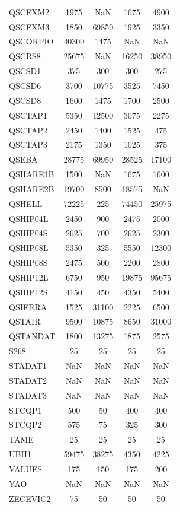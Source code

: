 \begin{longtable}{lcccc}
QSCFXM2  &     1975 &   NaN &     1675 &     4900 \\
QSCFXM3  &     1850 & 69850 &     1925 &     3350 \\
QSCORPIO &    40300 &  1475 &      NaN &      NaN \\
QSCRS8   &    25675 &   NaN &    16250 &    38950 \\
QSCSD1   &      375 &   300 &      300 &      275 \\
QSCSD6   &     3700 & 10775 &     3525 &     7450 \\
QSCSD8   &     1600 &  1475 &     1700 &     2500 \\
QSCTAP1  &     5350 & 12500 &     3075 &     2275 \\
QSCTAP2  &     2450 &  1400 &     1525 &      475 \\
QSCTAP3  &     2175 &  1350 &     1025 &      375 \\
QSEBA    &    28775 & 69950 &    28525 &    17100 \\
QSHARE1B &     1500 &   NaN &     1675 &     1600 \\
QSHARE2B &    19700 &  8500 &    18575 &      NaN \\
QSHELL   &    72225 &   225 &    74450 &    25975 \\
QSHIP04L &     2450 &   900 &     2475 &     2000 \\
QSHIP04S &     2625 &   700 &     2625 &     2300 \\
QSHIP08L &     5350 &   325 &     5550 &    12300 \\
QSHIP08S &     2475 &   500 &     2200 &     2800 \\
QSHIP12L &     6750 &   950 &    19875 &    95675 \\
QSHIP12S &     4150 &   450 &     4350 &     5400 \\
QSIERRA  &     1525 & 31100 &     2225 &     6500 \\
QSTAIR   &     9500 & 10875 &     8650 &    31000 \\
QSTANDAT &     1800 & 13275 &     1875 &     2575 \\
S268     &       25 &    25 &       25 &       25 \\
STADAT1  &      NaN &   NaN &      NaN &      NaN \\
STADAT2  &      NaN &   NaN &      NaN &      NaN \\
STADAT3  &      NaN &   NaN &      NaN &      NaN \\
STCQP1   &      500 &    50 &      400 &      400 \\
STCQP2   &      575 &    75 &      325 &      300 \\
TAME     &       25 &    25 &       25 &       25 \\
UBH1     &    59475 & 38275 &     4350 &     4225 \\
VALUES   &      175 &   150 &      175 &      200 \\
YAO      &      NaN &   NaN &      NaN &      NaN \\
ZECEVIC2 &       75 &    50 &       50 &       50 \\
\end{longtable}
